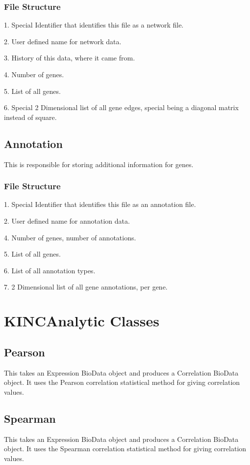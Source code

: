 \documentclass[10pt]{article}
\begin{document}
\subsubsection{File Structure}

\begin{list}{}{}
\item[1.] Special Identifier that identifies this file as a network file.
\item[2.] User defined name for network data.
\item[3.] History of this data, where it came from.
\item[4.] Number of genes.
\item[5.] List of all genes.
\item[6.] Special 2 Dimensional list of all gene edges, special being a 
diagonal matrix instead of square.
\end{list}

\subsection{Annotation}

This is responsible for storing additional information for genes.

\subsubsection{File Structure}

\begin{list}{}{}
\item[1.] Special Identifier that identifies this file as an annotation file.
\item[2.] User defined name for annotation data.
\item[4.] Number of genes, number of annotations.
\item[5.] List of all genes.
\item[6.] List of all annotation types.
\item[7.] 2 Dimensional list of all gene annotations, per gene.
\end{list}

\newpage
\section{KINCAnalytic Classes}

\subsection{Pearson}

This takes an Expression BioData object and produces a Correlation BioData 
object. It uses the Pearson correlation statistical method for giving 
correlation values.

\subsection{Spearman}

This takes an Expression BioData object and produces a Correlation BioData 
object. It uses the Spearman correlation statistical method for giving 
correlation values.
\end{document}
